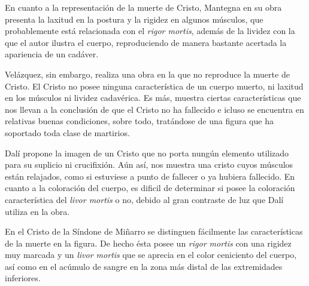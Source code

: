 En cuanto a la representación de la muerte de Cristo, Mantegna en su obra presenta la laxitud en la postura y la rigidez en algunos músculos, que probablemente está relacionada con el \textit{rigor mortis}, además de la lividez con la que el autor ilustra el cuerpo, reproduciendo de manera bastante acertada la apariencia de un cadáver.

Velázquez, sin embargo, realiza una obra en la que no reproduce la muerte de Cristo. El Cristo no posee ninguna característica de un cuerpo muerto, ni laxitud en los músculos ni lividez cadavérica. Es más, muestra ciertas características que nos llevan a la conclusión de que el Cristo no ha fallecido e icluso se encuentra en relativas buenas condiciones, sobre todo, tratándose de una figura que ha soportado toda clase de martirios.

Dalí propone la imagen de un Cristo que no porta nungún elemento utilizado para su suplicio ni crucifixión. Aún así, nos muestra una cristo cuyos músculos están relajados, como si estuviese a punto de fallecer o ya hubiera fallecido. En cuanto a la coloración del cuerpo, es dificil de determinar si posee la coloración característica del \textit{livor mortis} o no, debido al gran contraste de luz que Dalí utiliza en la obra.

En el Cristo de la Síndone de Miñarro se distinguen fácilmente las características de la muerte en la figura. De hecho ésta posee un \textit{rigor mortis} con una rigidez muy marcada y un \textit{livor mortis} que se aprecia en el color ceniciento del cuerpo, así como en el acúmulo de sangre en la zona más distal de las extremidades inferiores.